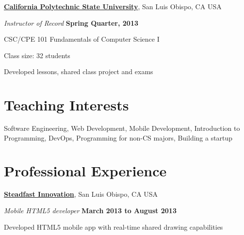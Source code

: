 \documentclass[10pt]{article}
\begin{document}
\href{http://www.calpoly.edu/}{\textbf{California Polytechnic State University}},
San Luis Obispo, CA USA
\begin{outerlist}
\item[] \textit{Instructor of Record}%
    \hfill \textbf{Spring Quarter, 2013 }
    \begin{innerlist}%
       \item CSC/CPE 101 Fundamentals of Computer Science I %
       \item Class size: 32 students 
       \item Developed lessons, shared class project and exams
\end{innerlist}

\end{outerlist}




\section{Teaching Interests}

Software Engineering,
Web Development,
Mobile Development,
Introduction to Programming,
DevOps,
Programming for non-CS majors,
Building a startup

\vspace{-5pt}







\section{Professional Experience}

\href{http://steadfastinnovation.com/}{\textbf{Steadfast Innovation}},
San Luis Obispo, CA USA
\begin{outerlist}
\item[] \textit{Mobile HTML5 developer}%
    \hfill \textbf{March 2013 to August 2013}%
    \begin{innerlist}
    \item Developed HTML5 mobile app with real-time shared drawing capabilities 
    \end{innerlist}
\end{outerlist}
\end{document}
